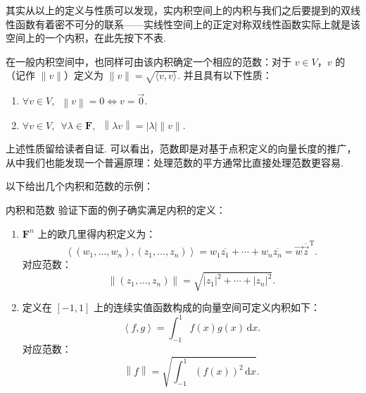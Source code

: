 其实从以上的定义与性质可以发现，实内积空间上的内积与我们之后要提到的双线性函数有着密不可分的联系——实线性空间上的正定对称双线性函数实际上就是该空间上的一个内积，在此先按下不表.

在一般内积空间中，也同样可由该内积确定一个相应的范数：对于 $v \in V$，$v$ 的（记作 $ \lVert v \rVert $）定义为 $ \lVert v \rVert = \sqrt{\langle v, v \rangle}$. 并且具有以下性质：


\begin{enumerate}
    \item $\forall v \in V, \enspace \left\lVert v \right\rVert = 0 \iff v = \vec{0}$.

    \item $\forall v \in V, \enspace \forall \lambda \in \mathbf{F}, \enspace \left\lVert \lambda v \right\rVert  = \left\lvert \lambda \right\rvert \lVert v \rVert$.
\end{enumerate}

上述性质留给读者自证. 可以看出，范数即是对基于点积定义的向量长度的推广，从中我们也能发现一个普遍原理：处理范数的平方通常比直接处理范数更容易.

以下给出几个内积和范数的示例：

\begin{example}{}{内积和范数}
    验证下面的例子确实满足内积的定义：
    \begin{enumerate}
        \item $\mathbf{F}^{n}$ 上的欧几里得内积定义为：
              \[\left\langle (w_1, \ldots, w_n), (z_1, \ldots, z_n)\right\rangle = w_1\overline{z_1} + \cdots + w_n\overline{z_n} = \vec{w}\overline{\vec{z}}^{\mathrm{T}}.\]
              对应范数：
              \[\left\lVert (z_1, \ldots, z_n) \right\rVert  = \sqrt{\lvert z_1 \rvert^2 + \cdots + \lvert z_n \rvert^2}.\]

        \item \label{item:23:内积和范数:2}
              定义在 $ \left[-1, 1\right] $ 上的连续实值函数构成的向量空间可定义内积如下：
              \[\left\langle f, g\right\rangle = \int_{-1}^1f(x)g(x)\,\mathrm{d}x.\]
              对应范数：
              \[\left\lVert f \right\rVert = \sqrt{\int_{-1}^1(f(x))^2\,\mathrm{d}x}.\]
    \end{enumerate}
\end{example}

